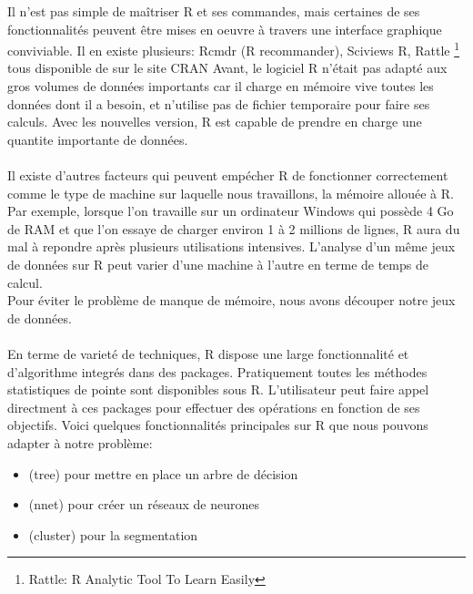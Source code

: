 \documentclass[11pt,a4paper]{report}
\begin{document}
    Il n'est pas simple de maîtriser R et ses commandes, mais certaines de ses fonctionnalités peuvent être mises en oeuvre à travers une interface graphique conviviable. Il en existe plusieurs: 
Rcmdr (R recommander), Sciviews R, Rattle \footnote{Rattle:  R Analytic Tool To Learn Easily}  tous disponible de sur le site CRAN \cite{r}
Avant, le logiciel R n'était pas adapté aux gros volumes de données importants car il charge en mémoire vive toutes les données dont il a besoin, et n'utilise pas de fichier temporaire pour faire ses calculs. Avec les nouvelles version, R est capable de prendre en charge une quantite importante de données. \\\\
Il existe d'autres facteurs qui peuvent empécher R de fonctionner correctement comme le type de machine sur laquelle nous travaillons, la mémoire allouée à R. Par exemple, lorsque l'on travaille sur un ordinateur Windows qui possède 4 Go de RAM  et que l'on essaye de charger environ 1 à 2 millions de lignes, R aura du mal à repondre après plusieurs utilisations intensives. L'analyse d'un même jeux de données sur R peut varier d'une machine à l'autre en terme de temps de calcul. \\ Pour éviter le problème de manque de mémoire, nous avons découper notre jeux de données. \\\\

En terme de varieté de techniques, R dispose une large fonctionnalité et d'algorithme integrés dans des packages. Pratiquement toutes les méthodes statistiques de pointe sont disponibles sous R. L'utilisateur peut faire appel directment à ces packages pour effectuer des opérations en fonction de ses objectifs. 
Voici quelques fonctionnalités principales  sur R que nous pouvons adapter à notre problème: 

\begin{itemize}
\item (tree) pour mettre en place un arbre de décision
\item (nnet) pour créer un réseaux de neurones 
\item (cluster) pour la segmentation 
\end{itemize}
\end{document}
